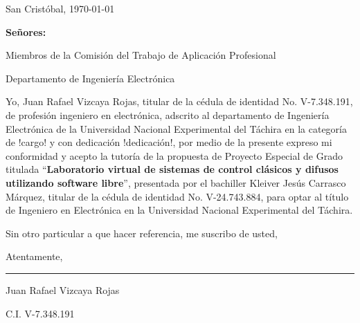 \begin{titlepage}
\setcounter{page}{3}
\setlength{\parindent}{1.5cm}					%
\setlength{\parskip}{0pt}						%

\begin{flushright}
	San Cristóbal, \today
\end{flushright}

\vspace{1cm}
\vfill

\begin{flushleft}
		\singlespacing
		
		\setlength{\parskip}{0pt}
		
		\textbf{Señores:}
		
		Miembros de la Comisión del Trabajo de Aplicación Profesional
		
		Departamento de Ingeniería Electrónica
		
\end{flushleft}

\vfill
\begin{spacing}{1.5}
	Yo, Juan Rafael Vizcaya Rojas, titular de la cédula de identidad No. \mbox{V-7.348.191}, de profesión ingeniero en electrónica, adscrito al departamento de Ingeniería Electrónica de la Universidad Nacional Experimental del Táchira en la categoría de !cargo! y con dedicación !dedicación!, por medio de la presente expreso mi conformidad y acepto la tutoría de la propuesta de Proyecto Especial de Grado titulada \enquote{\textbf{Laboratorio virtual de sistemas de control clásicos y difusos utilizando software libre}}, presentada por el bachiller Kleiver Jesús Carrasco Márquez, titular de la cédula de identidad No. \mbox{V-24.743.884}, para optar al título de Ingeniero en Electrónica en la Universidad Nacional Experimental del Táchira.
	
	Sin otro particular a que hacer referencia, me suscribo de usted,
	
	\setlength{\parskip}{20pt} 
	
	\noindent Atentamente,
\end{spacing}

\vfill

\begin{center}
	
	\rule{6cm}{1pt}
	
	\vspace{0.2cm}
	
	Juan Rafael Vizcaya Rojas
	
	\setlength{\parskip}{0pt}
	
	C.I. V-7.348.191
\end{center}

\vspace{0.5cm}
\end{titlepage}